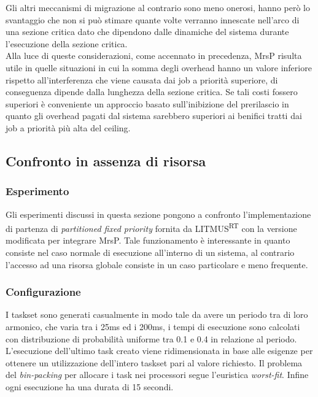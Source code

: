 \noindent Gli altri meccanismi di migrazione al contrario sono meno onerosi, hanno però lo svantaggio che non si può stimare quante volte verranno innescate nell'arco di una sezione critica dato che dipendono dalle dinamiche del sistema durante l'esecuzione della sezione critica.\\

\noindent Alla luce di queste considerazioni, come accennato in precedenza, MrsP risulta utile in quelle situazioni in cui la somma degli overhead hanno un valore inferiore rispetto all'interferenza che viene causata dai job a priorità superiore, di conseguenza dipende dalla lunghezza della sezione critica. Se tali costi fossero superiori è conveniente un approccio basato sull'inibizione del prerilascio in quanto gli overhead pagati dal sistema sarebbero superiori ai benifici tratti dai job a priorità più alta del ceiling.

\subsection{Confronto in assenza di risorsa}
\label{sec:confronto_norisorsa}

\subsubsection{Esperimento}
\label{sec:confronto_norisorsa_exp}

\noindent Gli esperimenti discussi in questa sezione pongono a confronto l'implementazione di partenza di \textit{partitioned fixed priority} fornita da LITMUS\textsuperscript{RT} con la versione modificata per integrare MrsP. Tale funzionamento è interessante in quanto consiste nel caso normale di esecuzione all'interno di un sistema, al contrario l'accesso ad una risorsa globale consiste in un caso particolare e meno frequente.

\subsubsection{Configurazione}
\label{sec:confronto_norisorsa_conf}

\noindent I taskset sono generati casualmente in modo tale da avere un periodo tra di loro armonico, che varia tra i 25ms ed i 200ms, i tempi di esecuzione sono calcolati con distribuzione di probabilità uniforme tra 0.1 e 0.4 in relazione al periodo. L'esecuzione dell'ultimo task creato viene ridimensionata in base alle esigenze per ottenere un utilizzazione dell'intero taskset pari al valore richiesto. Il problema del \textit{bin-packing} per allocare i task nei processori segue l'euristica \textit{worst-fit}. Infine ogni esecuzione ha una durata di 15 secondi.\\

